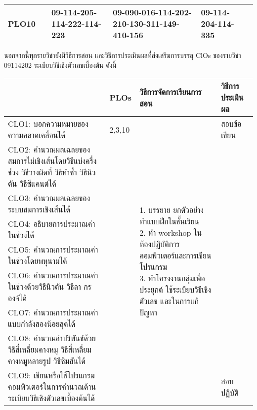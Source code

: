 \begin{longtable}{|p{}|p{}|p{}|p{}|p{}|p{}|}
PLO10&&
09-114-205\newline
09-114-222\newline
09-114-223
&
09-090-016\newline
09-114-202\newline
09-210-130\newline
09-311-149\newline
09-410-156
&
09-114-204\newline
09-114-335
&\\\hline
\end{longtable}

นอกจากนี้ทุกรายวิชายังมีวิธีการสอน และวิธีการประเมินผลที่ส่งเสริมการบรรลุ ClOs ของรายวิชา 09114202 ระเบียบวิธีเชิงตัวเลขเบื้องต้น ดังนี้

\begin{longtable}{|>{\raggedright}p{}|p{}|p{}|p{}|}
\hline
\multicolumn{1}{|c|}{\textbf{CLOs}}&\textbf{PLOs}&\textbf{วิธีการจัดการเรียนการสอน}&\textbf{วิธีการประเมินผล} \\\hline
\endhead
CLO1:\,\,บอกความหมายของความคลาดเคลื่อนได้&2,3,10&\multirow{9}{0.3\textwidth}{1. บรรยาย ยกตัวอย่าง ทำแบบฝึกในชั้นเรียน\newline
	2. ทำ workshop ในห้องปฏิบัติการคอมพิวเตอร์และการเขียนโปรแกรม\newline
	3.  ทำโครงงานกลุ่มเพื่อประยุกต์ ใช้ระเบียบวิธีเชิงตัวเลข และในการแก้ปัญหา}
	&สอบข้อเขียน\\\cline{1-1}

CLO2:\,\,คำนวณผลเฉลยของสมการไม่เชิงเส้นโดยวิธีแบ่งครึ่งช่วง วิธีวางผิดที่ วิธีทำซ้ำ วิธีนิวตัน วิธีซีแคนต์ได้&&&\\\cline{1-1}
CLO3:\,\,คำนวณผลเฉลยของระบบสมการเชิงเส้นได้&&&\\\cline{1-1}
CLO4:\,\,อธิบายการประมาณค่าในช่วงได้&&&\\\cline{1-1}
CLO5:\,\,คำนวณการประมาณค่าในช่วงโดยพหุนามได้&&&\\\cline{1-1}
CLO6:\,\,คำนวณการประมาณค่าในช่วงด้วยวิธีนิวตัน วิธีลา กรองจ์ได้&&&\\\cline{1-1}
CLO7:\,\,คำนวณการประมาณค่าแบบกำลังสองน้อยสุดได้&&&\\\hline
CLO8:\,\,คำนวณค่าปริพันธ์ด้วยวิธีสี่เหลี่ยมคางหมู วิธีสี่เหลี่ยมคางหมูหลายรูป วิธีซิมสันได้&&&\\\cline{1-1}\cline{4-4}
CLO9: เขียนหรือใช้โปรแกรมคอมพิวเตอร์ในการคํานวณด้านระเบียบวิธีเชิงตัวเลขเบื้องต้นได้&&&สอบปฏิบัติ\\\hline
\end{longtable}




